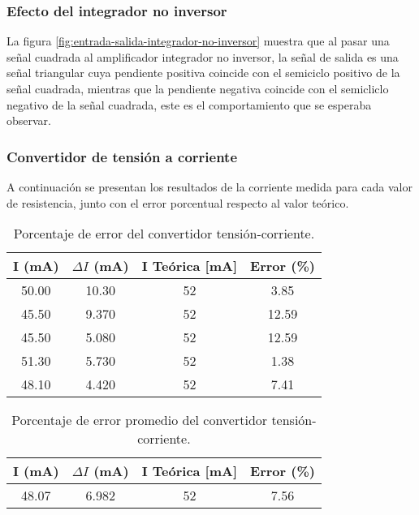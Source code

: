 \subsubsection{Efecto del integrador no inversor}

La figura \ref{fig:entrada-salida-integrador-no-inversor} muestra que al pasar una señal cuadrada al amplificador integrador no inversor, la señal de salida es una señal triangular cuya pendiente positiva coincide con el semiciclo positivo de la señal cuadrada, mientras que la pendiente negativa coincide con el semicliclo negativo de la señal cuadrada, este es el comportamiento que se esperaba observar.

\subsubsection{Convertidor de tensión a corriente}

A continuación se presentan los resultados de la corriente medida para cada valor de resistencia, junto con el error porcentual respecto al valor teórico.

\begin{table}[h!]
\centering
\begin{tabular}{|c|c|c|c|}
\hline
I (mA) & \(\Delta I\) (mA) & I Teórica [mA] & Error (\%) \\ \hline
50.00 & 10.30 & 52 & 3.85 \\ \hline
45.50 & 9.370 & 52 & 12.59 \\ \hline
45.50 & 5.080 & 52 & 12.59 \\ \hline
51.30 & 5.730 & 52 & 1.38 \\ \hline
48.10 & 4.420 & 52 & 7.41 \\ \hline
\end{tabular}
\caption{Porcentaje de error del convertidor tensión-corriente.}
\label{tab:analisis-resultados-convertidor-tension-corriente}
\end{table}

\begin{table}[h!]
\centering
\begin{tabular}{|c|c|c|c|}
\hline
I (mA) & \(\Delta I\) (mA) & I Teórica [mA] & Error (\%) \\ \hline
48.07 & 6.982 & 52 & 7.56 \\ \hline
\end{tabular}
\caption{Porcentaje de error promedio del convertidor tensión-corriente.}
\label{tab:analisis-resultados-convertidor-tension-corriente-promedio}
\end{table}

